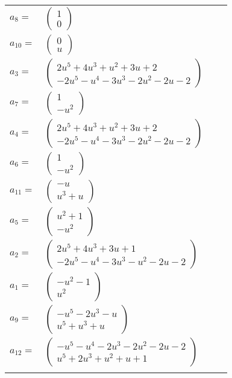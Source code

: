 \documentclass[1p]{elsarticle_modified}
\theoremstyle{definition}
\begin{document}
\begin{tabular}{m{7pt} m{180pt} m{7pt} m{180pt} }
\flushright $a_{8}=$&$\begin{pmatrix}1\\0\end{pmatrix}$ \\
\flushright $a_{10}=$&$\begin{pmatrix}0\\u\end{pmatrix}$ \\
\flushright $a_{3}=$&$\begin{pmatrix}2 u^5+4 u^3+u^2+3 u+2\\-2 u^5- u^4-3 u^3-2 u^2-2 u-2\end{pmatrix}$ \\
\flushright $a_{7}=$&$\begin{pmatrix}1\\- u^2\end{pmatrix}$ \\
\flushright $a_{4}=$&$\begin{pmatrix}2 u^5+4 u^3+u^2+3 u+2\\-2 u^5- u^4-3 u^3-2 u^2-2 u-2\end{pmatrix}$ \\
\flushright $a_{6}=$&$\begin{pmatrix}1\\- u^2\end{pmatrix}$ \\
\flushright $a_{11}=$&$\begin{pmatrix}- u\\u^3+u\end{pmatrix}$ \\
\flushright $a_{5}=$&$\begin{pmatrix}u^2+1\\- u^2\end{pmatrix}$ \\
\flushright $a_{2}=$&$\begin{pmatrix}2 u^5+4 u^3+3 u+1\\-2 u^5- u^4-3 u^3- u^2-2 u-2\end{pmatrix}$ \\
\flushright $a_{1}=$&$\begin{pmatrix}- u^2-1\\u^2\end{pmatrix}$ \\
\flushright $a_{9}=$&$\begin{pmatrix}- u^5-2 u^3- u\\u^5+u^3+u\end{pmatrix}$ \\
\flushright $a_{12}=$&$\begin{pmatrix}- u^5- u^4-2 u^3-2 u^2-2 u-2\\u^5+2 u^3+u^2+u+1\end{pmatrix}$\\&\end{tabular}
\end{document}
